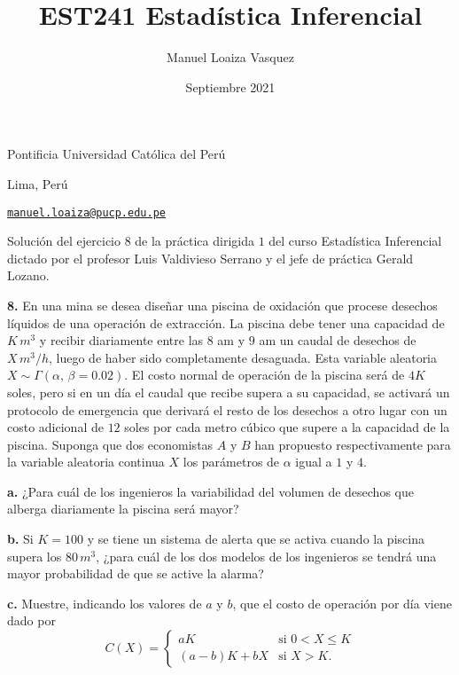 \documentclass{article}
\title{EST241 Estad\'istica Inferencial}
\author{Manuel Loaiza Vasquez}
\date{Septiembre 2021}
\newenvironment{statement}[1]{\smallskip\noindent\color[rgb]{1.00,0.00,0.50} {\bf #1.}}{}
\theoremstyle{definition}
\theoremstyle{remark}
\begin{document}
\maketitle

\vspace*{-0.25in}
\centerline{Pontificia Universidad Cat\'olica del Per\'u}
\centerline{Lima, Per\'u}
\centerline{\href{mailto:manuel.loaiza@pucp.edu.pe}{{\tt manuel.loaiza@pucp.edu.pe}}}
\vspace*{0.15in}

\begin{framed}
  Soluci\'on del ejercicio $8$ de la pr\'actica dirigida $1$ del curso
  Estad\'istica Inferencial dictado por el profesor Luis Valdivieso Serrano
  y el jefe de pr\'actica Gerald Lozano.
\end{framed}

\begin{statement}{8}
  En una mina se desea dise\~nar una piscina de oxidaci\'on que procese desechos
  l\'iquidos de una operaci\'on de extracci\'on.
  La piscina debe tener una capacidad de $K\,m^3$ y recibir diariamente entre
  las $8$ am y $9$ am un caudal de desechos de $X\,m^3 / h$, luego de haber
  sido completamente desaguada.
  Esta variable aleatoria $X \sim \Gamma(\alpha,\,\beta = 0.02)$.
  El costo normal de operaci\'on de la piscina ser\'a de $4K$ soles, pero si en
  un d\'ia el caudal que recibe supera a su capacidad, se activar\'a un protocolo
  de emergencia que derivar\'a el resto de los desechos a otro lugar con un costo
  adicional de $12$ soles por cada metro c\'ubico que supere a la capacidad de
  la piscina.
  Suponga que dos economistas $A$ y $B$ han propuesto respectivamente para la
  variable aleatoria continua $X$ los par\'ametros de $\alpha$ igual a $1$ y $4$.
\end{statement}

\begin{statement}{a}
  ¿Para cu\'al de los ingenieros la variabilidad del volumen de desechos que
  alberga diariamente la piscina ser\'a mayor?
\end{statement}

\begin{statement}{b}
  Si $K = 100$ y se tiene un sistema de alerta que se activa cuando la piscina
  supera los $80\,m^3$, ¿para cu\'al de los dos modelos de los ingenieros se
  tendr\'a una mayor probabilidad de que se active la alarma?
\end{statement}

\begin{statement}{c}
  Muestre, indicando los valores de $a$ y $b$, que el costo de operaci\'on
  por d\'ia viene dado por
  \[
    C(X) =
    \begin{cases}
      a K             & \text{si $0 < X \leq K$}\\
      (a - b) K + b X & \text{si $X > K$}.
    \end{cases}  
  \]
\end{statement}
\end{document}
